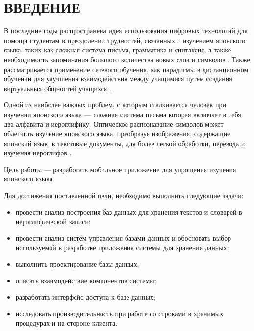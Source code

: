 \chapter*{ВВЕДЕНИЕ}

В последние годы распространена идея использования цифровых
технологий для помощи студентам в преодолении трудностей,
связанных с изучением японского языка, таких как сложная система
письма, грамматика и синтаксис, а также необходимость запоминания
большого количества новых слов и символов \cite{muhtarova}.
Также рассматривается применение сетевого обучения, как парадигмы в
дистанционном обучении для улучшения взаимодействия между
учащимися путем создания виртуальных общностей учащихся \cite{edu-network}.

Одной из наиболее важных проблем, с которым сталкивается человек
при изучении японского языка --- сложная система письма которая
включает в себя два алфавита и иероглифику. Оптическое распознавание
символов может облегчить изучение японского языка, преобразуя
изображения, содержащие японский язык, в текстовые документы,
для более легкой обработки, перевода и изучения иероглифов \cite{ocr-usage}.

Цель работы --- разработать мобильное приложение для упрощения
изучения японского языка.

Для достижения поставленной цели, необходимо выполнить следующие
задачи:

\begin{itemize}[label={$-$}]
  \item провести анализ построения баз данных для хранения текстов и словарей в иероглифической записи;
  \item провести анализ систем управления базами данных и обосновать
    выбор используемой в разработке приложения системы для хранения данных;
  \item выполнить проектирование базы данных;
  \item описать взаимодействие компонентов системы;
  \item разработать интерфейс доступа к базе данных;
  \item исследовать производительность при работе со строками в хранимых процедурах
    и на стороне клиента.
\end{itemize}

